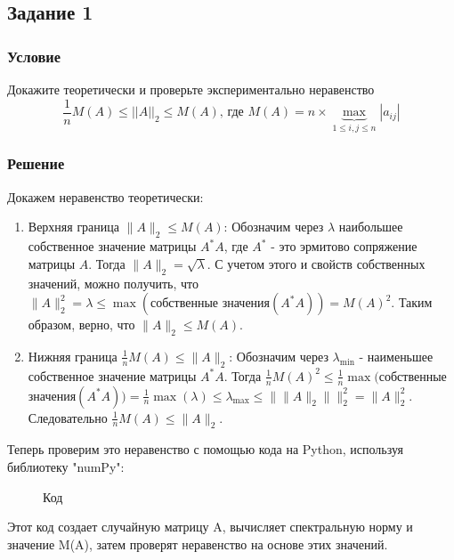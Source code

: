 \subsection{Задание 1}
\subsubsection{Условие}
Докажите теоретически и проверьте экспериментально неравенство
\[\frac{1}{n}M(A) \leq ||A||_2 \leq M(A) \text{, где } M(A) = n \times \underbrace{\max}_{1 \leq i,j \leq n} |a_{ij}|\]
\subsubsection{Решение}
Докажем неравенство теоретически:

\begin{enumerate}
\item
  Верхняя граница \(\|A\|_2 \leq M(A)\):
Обозначим через \(\lambda\) наибольшее собственное значение матрицы \(A^*A\), где \(A^*\) - это эрмитово сопряжение матрицы \(A\).
Тогда \( \|A\|_2 = \sqrt{\lambda} \). С учетом этого и свойств собственных значений, можно получить,
что \( \|A\|_2^2 =\lambda \leq \max( \text{собственные значения}(A^*A)) = M(A)^2 \). Таким образом, верно, что \( \|A\|_2 \leq M(A) \).
\item
Нижняя граница \(\frac{1}{n}M(A) \leq \|A\|_2\):
Обозначим через \(\lambda_{\text{min}}\) - наименьшее собственное значение матрицы \(A^*A\).
Тогда \( \frac{1}{n}M(A)^2 \leq \frac{1}{n} \max(\text{собственные}\)
\(\text{значения}(A^*A))=\frac{1}{n} \max(\lambda) \leq \lambda_{\text{max}} \leq \|\|A\|_2 \|\|^2_2 = \|A\|^2_2 \).
Следовательно \(\frac{1}{n}M(A) \leq \|A\|_2\).
\end{enumerate}

Теперь проверим это неравенство с помощью кода на Python, используя библиотеку "numPy": 

\begin{figure}[H]
  
  \caption*{Код}
\end{figure}

Этот код создает случайную матрицу A, вычисляет спектральную норму и значение M(A), затем проверят неравенство на основе этих значений.
